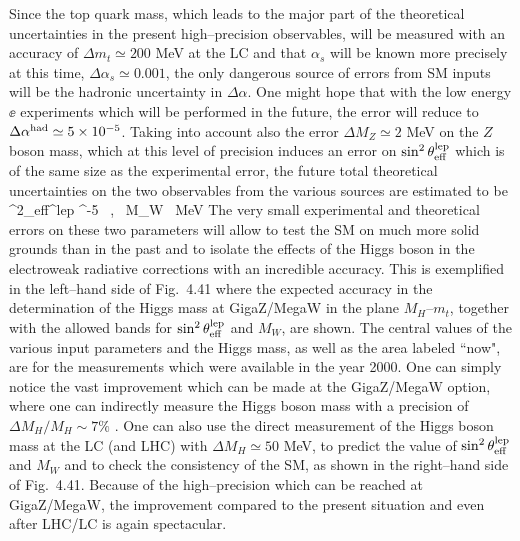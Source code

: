 Since the top quark mass, which leads to the major part of the theoretical
uncertainties in the present high--precision observables, will be measured with
an accuracy of $\Delta m_t \simeq 200$ MeV at the LC and that $\alpha_s$ will be
known more precisely at this time, $\Delta \alpha_s \simeq 0.001$, the only
dangerous source of errors from SM inputs will be the hadronic uncertainty in
$\Delta \alpha$. One might hope that with the low energy $\ee$ experiments
which will be performed in the future, the error will reduce to $\Delta 
\alpha^{\rm had} \simeq 5 \times 10^{-5}$. Taking into account also the error 
 $\Delta M_Z \simeq 2$ MeV on the $Z$ boson mass, which at this level of 
precision induces an error on $\sin^2\theta_{\rm eff}^{\rm lep}$ which is of 
the same size as the experimental error, the future total theoretical 
uncertainties on the two observables from the various sources are estimated 
to be \cite{GigaZ-P}
\beq 
\Delta \sin^2\theta_{\rm eff}^{\rm lep} \simeq {} ^{-5} \ , \
\Delta M_W \simeq {}~{\rm MeV}
\eeq
The very small experimental and theoretical errors on these two parameters
will allow to test the SM on much more solid grounds than in the past and to 
isolate the effects of the Higgs boson in the electroweak radiative corrections
with an incredible accuracy. This is exemplified in the left--hand side of 
Fig.~4.41 where the expected accuracy in the determination of the Higgs  
mass at GigaZ/MegaW in the plane $M_H$--$m_t$, together with the allowed bands 
for $\sin^2\theta_{\rm eff}^{\rm lep}$ and $M_W$, are shown. The central 
values of the various input parameters and the Higgs mass, as well as the area 
labeled ``now", are for the measurements which were available in the year 2000. 
One can simply notice the vast improvement which can be made at the 
GigaZ/MegaW option, where one can indirectly measure the Higgs boson mass 
with a precision of $\Delta M_H/M_H \sim 7\%$ \cite{GigaZ-P}. One can also use 
the direct measurement of the Higgs boson mass at the LC (and LHC) with
$\Delta M_H \simeq 50$ MeV, to predict the value of $\sin^2\theta_{\rm eff}^{\rm
lep}$ and $M_W$ and to check the consistency of the SM, as shown in the
right--hand side of Fig.~4.41. Because of the high--precision which can be 
reached at GigaZ/MegaW, the improvement compared to the present situation and 
even after LHC/LC is again spectacular.

